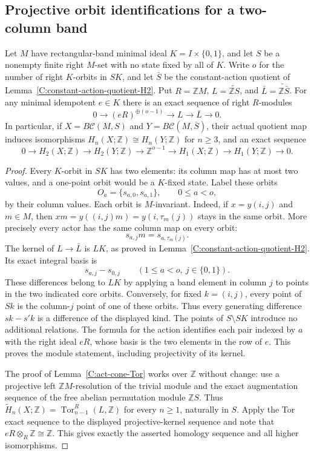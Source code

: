 \subsection{Projective orbit identifications for a two-column band}

\begin{lemma}
\label{C:two-column-projective-orbit-kernel}
Let $M$ have rectangular-band minimal ideal $K=I\times\{0,1\}$,
and let $S$ be a nonempty finite right $M$-set with no state fixed
by all of $K$.  Write $o$ for the number of right $K$-orbits in
$SK$, and let $\bar S$ be the constant-action quotient of
Lemma~\ref{C:constant-action-quotient-H2}.  Put
$R=\mathbb ZM$, $L=\widetilde{\mathbb ZS}$, and
$\bar L=\widetilde{\mathbb Z\bar S}$.  For any minimal idempotent
$e\in K$ there is an exact sequence of right $R$-modules
\[
 0\longrightarrow(eR)^{\oplus(o-1)}
   \longrightarrow L\longrightarrow\bar L\longrightarrow0.
\]
In particular, if $X=B\mathcal C(M,S)$ and
$Y=B\mathcal C(M,\bar S)$, their actual quotient map induces
isomorphisms $H_n(X;\mathbb Z)\cong H_n(Y;\mathbb Z)$ for
$n\geq3$, and an exact sequence
\[
 0\longrightarrow H_2(X;\mathbb Z)
 \longrightarrow H_2(Y;\mathbb Z)
 \longrightarrow\mathbb Z^{o-1}
 \longrightarrow H_1(X;\mathbb Z)
 \longrightarrow H_1(Y;\mathbb Z)\longrightarrow0.
\]
\end{lemma}
\begin{proof}
Every $K$-orbit in $SK$ has two elements: its column map has
at most two values, and a one-point orbit would be a $K$-fixed
state.  Label these orbits
\[
 O_a=\{s_{a,0},s_{a,1}\},\qquad 0\leq a<o,
\]
by their column values.  Each orbit is $M$-invariant.  Indeed,
if $x=y(i,j)$ and $m\in M$, then
$xm=y((i,j)m)=y(i,\tau_m(j))$ stays in the same orbit.
More precisely every actor has the same column map on every orbit:
\[
 s_{a,j}m=s_{a,\tau_m(j)}.
\]
The kernel of $L\to\bar L$ is $LK$, as proved in
Lemma~\ref{C:constant-action-quotient-H2}.  Its exact integral
basis is
\[
 s_{a,j}-s_{0,j}\qquad(1\leq a<o,\ j\in\{0,1\}).
\]
These differences belong to $LK$ by applying a band element in
column $j$ to points in the two indicated core orbits.
Conversely, for fixed $k=(i,j)$, every point of $Sk$ is the
column-$j$ point of one of these orbits.  Thus every generating
difference $sk-s'k$ is a difference of the displayed kind.
The points of $S\setminus SK$ introduce no additional relations.
The formula for the action identifies each pair indexed by $a$
with the right ideal $eR$, whose basis is the two elements in
the row of $e$.  This proves the module statement, including
projectivity of its kernel.

The proof of Lemma~\ref{C:act-cone-Tor} works over $\mathbb Z$
without change: use a projective left $\mathbb ZM$-resolution
of the trivial module and the exact augmentation sequence of
the free abelian permutation module $\mathbb ZS$.  Thus
$\widetilde H_n(X;\mathbb Z)=\operatorname{Tor}_{n-1}^R(L,\mathbb Z)$
for every $n\geq1$, naturally in $S$.  Apply the Tor exact
sequence to the displayed projective-kernel sequence and note
that $eR\otimes_R\mathbb Z\cong\mathbb Z$.  This gives exactly
the asserted homology sequence and all higher isomorphisms.
\end{proof}

